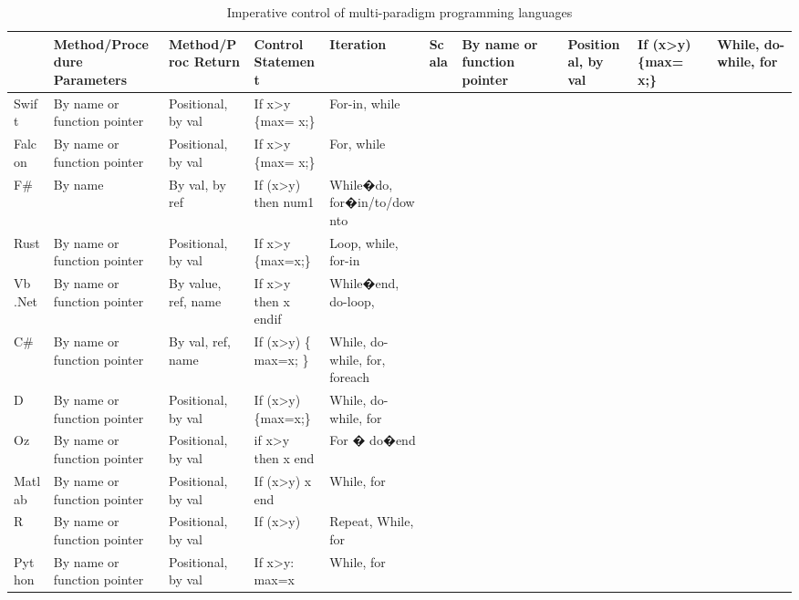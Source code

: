 \documentclass{sig-alternate}
\begin{document}
	\begin{table*}[]
		\centering
		\caption{Imperative control of multi-paradigm programming languages}
		
		\begin{tabular}{|l|l|l|l|l|}
			\hline
			&Method/Procedure Parameters & Method/Proc Return & Control Statement & Iteration                                            &                               \hline
			Scala           & By name or function pointer & Positional, by val                                                                  & If (x\textgreater{}y) \{max= x;\}    & While, do-while, for          \\ \hline
			Swift                    & By name or function pointer & Positional, by val                          & If x\textgreater{}y \{max= x;\}      & For-in, while                 \\ \hline
			Falcon                    & By name or function pointer & Positional, by val                                  & If x\textgreater{}y \{max= x;\}      & For, while                    \\ \hline
			F\#                      & By name                     & By val, by ref                                  & If (x\textgreater{}y) then num1           & While�do, for�in/to/downto    \\ \hline
			Rust                     & By name or function pointer & Positional, by val                       & If x\textgreater{}y \{max=x;\}   & Loop, while, for-in           \\ \hline
			Vb .Net                          & By name or function pointer & By value, ref, name                                     & If x\textgreater{}y then x endif              & While�end, do-loop, \\ \hline
			C\#              & By name or function pointer & By val, ref, name & If (x\textgreater{}y) \{ max=x; \} & While, do-while, for, foreach \\ \hline
			D                          & By name or function pointer & Positional, by val                       & If (x\textgreater{}y) \{max=x;\}     & While, do-while, for          \\ \hline
			Oz           & By name or function pointer & Positional, by val                                                                   & if x\textgreater{}y then x end                & For � do�end                  \\ \hline
			Matlab                     & By name or function pointer & Positional, by val                                              & If (x\textgreater{}y) x end                   & While, for                    \\ \hline
			R                          & By name or function pointer & Positional, by val                          & If (x\textgreater{}y)     & Repeat, While, for            \\ \hline
			Python                     & By name or function pointer & Positional, by val                                                 & If x\textgreater{}y: max=x               & While, for                    \\ \hline
		\end{tabular}
	\end{table*}
	
\end{document}
